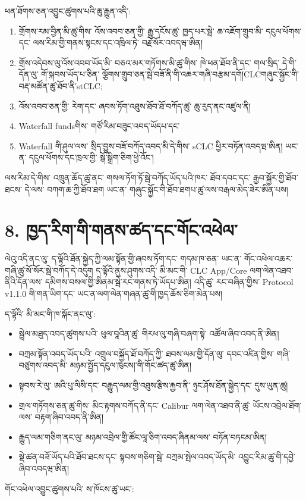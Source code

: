 \documentclass[11pt]{article}
\begin{document}
ཕན་ཐོགས་ཅན་འབྱུང་ཚུགས་པའི་ཆུ་རྒྱུན་འདི་:

\begin{enumerate}[leftmargin=*]
\item གྲོགས་རམ་བྱིན་མི་ཚུ་གིས་ འོས་འབབ་ཅན་གྱི་ རྒྱུ་དངོས་ཚུ་ ཁྱད་པར་སྦེ་ ཆ་འཇོག་གྲུབ་མི་ དངུལ་ཕོགས་དང་ ལས་རིམ་གྱི་གནས་སྟངས་དང་འཁྲིལ་ཏེ་ བརྗེ་སོར་འབདཝ་ཨིན།
\item གྲོས་འདེབས་ལུ་འོས་འབབ་ཡོད་མི་ བཅའ་མར་གཏོགས་མི་ཚུ་གིས་ ཁེ་ཕན་ཐོབ་ནི་དང་ གལ་སྲིད་ དེ་གི་དོན་ལུ་ གོ་སྐབས་ཡོད་པ་ཅིན་ ལྕོགས་གྲུབ་ཅན་སྦེ་བཟོ་ནི་གི་འཆར་གཞི་བརྩམ་དགོ།CLCགཞུང་སྐྱོང་གི་བརྡ་མཚོན་ཚུ་ཐོབ་ནི་stCLC;
\item འོས་འབབ་ཅན་གྱི་ རེག་དང་ ཞབས་ཏོག་འཐུས་ཐོབ་ཐོ་བཀོད་ཚུ་ ཆུ་རུད་ནང་འཛུལ་ནི།
\item Waterfall fundsགིས་ གཙོ་རིམ་བཟུང་འབད་ཡོདཔ་དང་
\item Waterfall གི་ཤུལ་ལས་ སྲིད་བྱུས་བཟོ་བཀོད་འབད་མི་དེ་གིས་ sCLC ཕྱིར་བཏོན་འབདཝ་ཨིན། ཡང་ན་ དངུལ་ཕོགས་དང་ཁྲལ་གྱི་ སྒོ་སྒྲིག་ཅིག་ཕྱེ་འོང་།
\end{enumerate}
ལས་རིམ་དེ་གིས་ འཁྲུན་ཆོད་ཚུ་ནང་ གསལ་ཏོག་ཏོ་སྦེ་བཀོད་ཡོད་པའི་ཁར་ ཐོབ་དབང་དང་ རྒྱབ་སྐྱོར་གྱི་ཐོབ་ཐངས་ དེ་ལས་ བཀག་ཆ་ཀྱི་ཐོབ་ཐག ཡང་ན་ གཞུང་སྐྱོང་གི་ཐོབ་ཐགཔ་ཚུ་ལས་བརྒལ་མེད་ཟེར་ཨིན་པས།


\section*{8. ཁྱད་རིག་གི་གནས་ཚད་དང་གོང་འཕེལ་}

ལེའུ་འདི་ནང་ལུ་ ད་ལྟོའི་ཐོན་སྐྱེད་ཀྱི་ལམ་སྟོན་གྱི་ཞབས་ཏོག་དང་ གདམ་ཁ་ཅན་ ཡང་ན་ གོང་འཕེལ་འཆར་གཞི་ཚུ་སོ་སོར་སྦེ་བཀོད་དེ་འདུག ད་ལྟོའི་ནུས་ཤུགས་འདི་ མི་མང་གི་ CLC App/Core ལག་ལེན་འཐབ་ནིའི་དོན་ལས་ དམིགས་བསལ་གྱི་ཨིནམ་སྦེ་རང་གནས་ཏེ་ཡོདཔ་ཨིན། འདི་ཚུ་ རང་བཞིན་གྱིས་ Protocol v1.1.0 གི་གན་ཡིག་དང་ ཡང་ན་ལག་ལེན་གཞན་ཚུ་གི་ཁྱད་ཆོས་ཅིག་མེན་པས།

ད་ལྟོའི་ མི་མང་གི་ཁ་སྐོང་ནང་ལུ་:

\begin{itemize}[leftmargin=*]
\item སྦྲེལ་མཐུད་འབད་ཚུགས་པའི་ ཕུལ་བཱའིན་ཚུ་ གིརཕ་ལུ་གཞི་བཞག་སྟེ་ འཚོལ་ཞིབ་འབད་ནི་ཨིན།
\item བཀྲམ་སྟོན་འབད་ཡོད་པའི་ འགྲུལ་བསྐྱོད་ཐོ་བཀོད་ཀྱི་ ཐབས་ལམ་གྱི་དོན་ལུ་ དབང་འཛིན་གྱིས་ གཞི་བཙུགས་འབད་མི་ མཉམ་སྤྱོད་དངུལ་ཁུངས།་གི་གོང་ཚད་ཚུ་ཨིན།
\item སྟབས་རེ་ལུ་ ཨའི་པུ་ལིསི་དང་ བརྒྱུད་ལམ་གྱི་འཐུས་རྩིས་རྐྱབ་ནི་ ཉུང་ཤོས་ཐོན་སྐྱེད་དང་ དུས་ཡུན་ཚུ།
\item གྲལ་གཏོགས་ཅན་ཚུ་གིས་ མིང་རྟགས་བཀོད་ནི་དང་ Calibur ལག་ལེན་འཐབ་ནི་ཚུ་ ཡོངས་འབྲེལ་ཐོག་ལས་ བརྟག་ཞིབ་འབད་ནི་ཨིན།
\item རྒྱུད་ལམ་གཅིག་ནང་ལུ་ མཉམ་འབྲེལ་གྱི་ཚོང་ལཱ་ཅིག་འབད་ཞིནམ་ལས་ བཏོན་བཏངམ་ཨིན།
\item སྡེ་ཚན་བཟོ་ཡོད་པའི་ཐོབ་ཐངས་དང་ སྟབས་གཅིག་སྦེ་ བཀྲམ་སྤེལ་འབད་ཡོད་མི་ འབྱུང་རིམ་ཚུ་གི་དབྱེ་ཞིབ་འབདཝ་ཨིན།
\end{itemize}
གོང་འཕེལ་འབྱུང་ཚུགས་པའི་ ས་ཁོངས་ཚུ་ཡང་:
\end{document}
